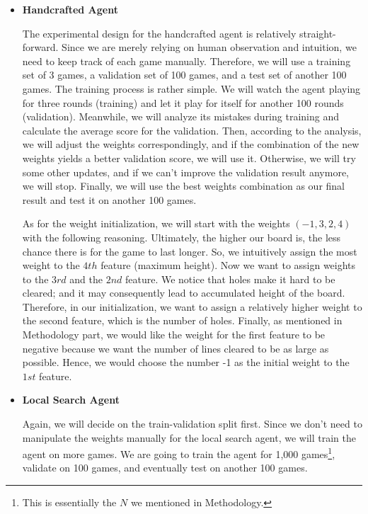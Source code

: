 \documentclass[letterpaper]{article} %
\begin{document}
\begin{itemize}
  \item \textbf{Handcrafted Agent} 
  
  The experimental design for the handcrafted agent is relatively straight-forward. Since we are merely relying on human observation and intuition, we need to keep track of each game manually. Therefore, we will use a training set of 3 games, a validation set of 100 games, and a test set of another 100 games. The training process is rather simple. We will watch the agent playing for three rounds (training) and let it play for itself for another 100 rounds (validation). Meanwhile, we will analyze its mistakes during training and calculate the average score for the validation. Then, according to the analysis, we will adjust the weights correspondingly, and if the combination of the new weights yields a better validation score, we will use it. Otherwise, we will try some other updates, and if we can't improve the validation result anymore, we will stop. Finally, we will use the best weights combination as our final result and test it on another 100 games.

  As for the weight initialization, we will start with the weights $(-1,3,2,4)$ with the following reasoning. Ultimately, the higher our board is, the less chance there is for the game to last longer. So, we intuitively assign the most weight to the $4th$ feature (maximum height). Now we want to assign weights to the $3rd$ and the $2nd$ feature. We notice that holes make it hard to be cleared; and it may consequently lead to accumulated height of the board. Therefore, in our initialization, we want to assign a relatively higher weight to the second feature, which is the number of holes. Finally, as mentioned in Methodology part, we would like the weight for the first feature to be negative because we want the number of lines cleared to be as large as possible. Hence, we would choose the number -1 as the initial weight to the $1st$ feature.

  \item \textbf{Local Search Agent} 
  
  Again, we will decide on the train-validation split first. Since we don't need to manipulate the weights manually for the local search agent, we will train the agent on more games. We are going to train the agent for 1,000 games\footnote{This is essentially the $N$ we mentioned in Methodology.}, validate on 100 games, and eventually test on another 100 games. 


\end{itemize}
\end{document}

